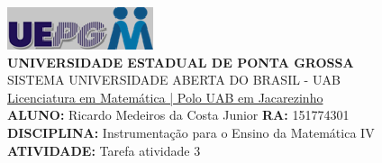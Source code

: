 \documentclass[a4paper, 12pt]{article}
\begin{document}
\includegraphics{logo}\\
\textbf{UNIVERSIDADE ESTADUAL DE PONTA GROSSA} \\
SISTEMA UNIVERSIDADE ABERTA DO BRASIL - UAB \\
\underline{Licenciatura em Matemática | Polo UAB em Jacarezinho} \\
\textbf{ALUNO:} Ricardo Medeiros da Costa Junior   \textbf{RA:} 151774301 \\
\textbf{DISCIPLINA:} Instrumentação para o Ensino da Matemática IV \\
\textbf{ATIVIDADE:} Tarefa atividade 3 \\
\end{document}
